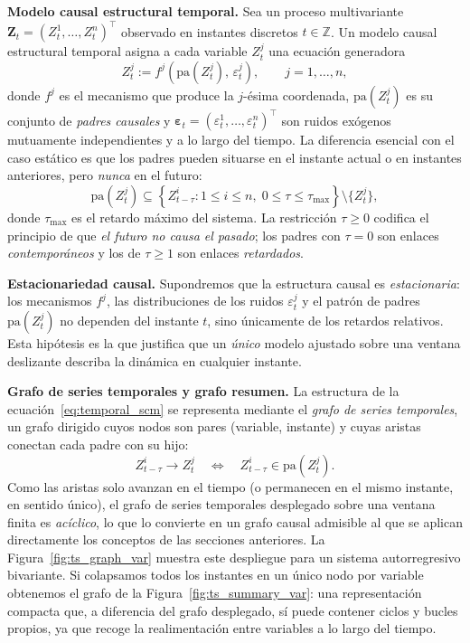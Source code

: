 \documentclass[12pt]{report} %
\begin{document}
\textbf{Modelo causal estructural temporal.} Sea un proceso multivariante $\mathbf{Z}_t = (Z^1_t, \ldots, Z^n_t)^\top$ observado en instantes discretos $t \in \mathbb{Z}$. Un modelo causal estructural temporal asigna a cada variable $Z^j_t$ una ecuación generadora
\begin{equation}
    Z^j_t := f^j\!\left(\mathrm{pa}(Z^j_t),\, \varepsilon^j_t\right), \qquad j = 1, \ldots, n,
    \label{eq:temporal_scm}
\end{equation}
donde $f^j$ es el mecanismo que produce la $j$-ésima coordenada, $\mathrm{pa}(Z^j_t)$ es su conjunto de \emph{padres causales} y $\boldsymbol{\varepsilon}_t = (\varepsilon^1_t, \ldots, \varepsilon^n_t)^\top$ son ruidos exógenos mutuamente independientes y a lo largo del tiempo. La diferencia esencial con el caso estático es que los padres pueden situarse en el instante actual o en instantes anteriores, pero \emph{nunca} en el futuro:
\begin{equation}
    \mathrm{pa}(Z^j_t) \subseteq \left\{ Z^i_{t-\tau} : 1 \le i \le n,\; 0 \le \tau \le \tau_{\max} \right\} \setminus \{Z^j_t\},
    \label{eq:parents_window}
\end{equation}
donde $\tau_{\max}$ es el retardo máximo del sistema. La restricción $\tau \ge 0$ codifica el principio de que \emph{el futuro no causa el pasado}; los padres con $\tau = 0$ son enlaces \emph{contemporáneos} y los de $\tau \ge 1$ son enlaces \emph{retardados}.

\textbf{Estacionariedad causal.} Supondremos que la estructura causal es \emph{estacionaria}: los mecanismos $f^j$, las distribuciones de los ruidos $\varepsilon^j_t$ y el patrón de padres $\mathrm{pa}(Z^j_t)$ no dependen del instante $t$, sino únicamente de los retardos relativos. Esta hipótesis es la que justifica que un \emph{único} modelo ajustado sobre una ventana deslizante describa la dinámica en cualquier instante.

\textbf{Grafo de series temporales y grafo resumen.} La estructura de la ecuación~\eqref{eq:temporal_scm} se representa mediante el \emph{grafo de series temporales}, un grafo dirigido cuyos nodos son pares (variable, instante) y cuyas aristas conectan cada padre con su hijo:
\begin{equation}
    Z^i_{t-\tau} \rightarrow Z^j_t \quad \Longleftrightarrow \quad Z^i_{t-\tau} \in \mathrm{pa}(Z^j_t).
    \label{eq:ts_edges}
\end{equation}
Como las aristas solo avanzan en el tiempo (o permanecen en el mismo instante, en sentido único), el grafo de series temporales desplegado sobre una ventana finita es \emph{acíclico}, lo que lo convierte en un grafo causal admisible al que se aplican directamente los conceptos de las secciones anteriores. La Figura~\ref{fig:ts_graph_var} muestra este despliegue para un sistema autorregresivo bivariante. Si colapsamos todos los instantes en un único nodo por variable obtenemos el grafo de la Figura~\ref{fig:ts_summary_var}: una representación compacta que, a diferencia del grafo desplegado, sí puede contener ciclos y bucles propios, ya que recoge la realimentación entre variables a lo largo del tiempo.
\end{document}
